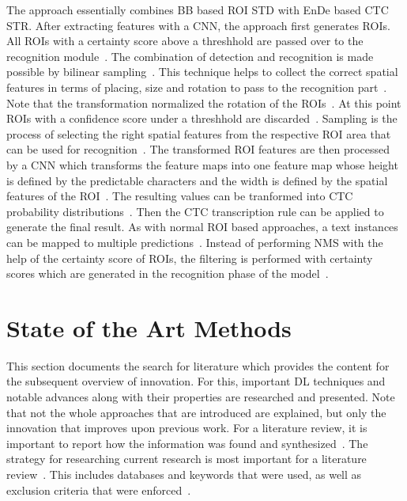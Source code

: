 The approach essentially combines \ac{BB} based \ac{ROI} \ac{STD} with \ac{EnDe} based \ac{CTC}
\ac{STR}.
After extracting features with a \ac{CNN}, the approach first generates \acp{ROI}.
All \acp{ROI} with a certainty score above a threshhold are passed over to the recognition
module~\citep{busta_deep_2017}.
The combination of detection and recognition is made possible by bilinear
sampling~\citep{busta_deep_2017}.
This technique helps to collect the correct spatial features in terms of placing, size and rotation
to pass to the recognition part~\citep{busta_deep_2017}.
Note that the transformation normalized the rotation of the \acp{ROI}~\citep{busta_deep_2017}.
At this point \acp{ROI} with a confidence score under a threshhold are
discarded~\citep{busta_deep_2017}.
Sampling is the process of selecting the right spatial features from the respective \ac{ROI} area
that can be used for recognition~\citep{liu_abcnet_2020}.
The transformed \ac{ROI} features are then processed by a \ac{CNN} which transforms the feature maps
into one feature map whose height is defined by the predictable characters and the width is defined
by the spatial features of the \ac{ROI}~\citep{busta_deep_2017}.
The resulting values can be tranformed into \ac{CTC} probability
distributions~\citep{busta_deep_2017,graves_connectionist_2006}.
Then the \ac{CTC} transcription rule can be applied to generate the final result.
As with normal \ac{ROI} based approaches, a text instances can be mapped to multiple
predictions~\citep{ren_faster_2016,busta_deep_2017}.
Instead of performing \ac{NMS} with the help of the certainty score of \acp{ROI}, the filtering
is performed with certainty scores which are generated in the recognition phase of the
model~\citep{busta_deep_2017}.

\section{State of the Art Methods}\label{se:innovations}
This section documents the search for literature which provides the content for the subsequent
overview of innovation.
For this, important \ac{DL} techniques and notable advances along with their properties are researched
and presented.
Note that not the whole approaches that are introduced are explained, but only the innovation that
improves upon previous work.
For a literature review, it is important to report how the information was found and
synthesized~\citep{torraco_writing_2005}.
The strategy for researching current research is most important for a literature
review~\citep{snyder_literature_2019}.
This includes databases and keywords that were used, as well as exclusion criteria that were
enforced~\citep{torraco_writing_2005}.

